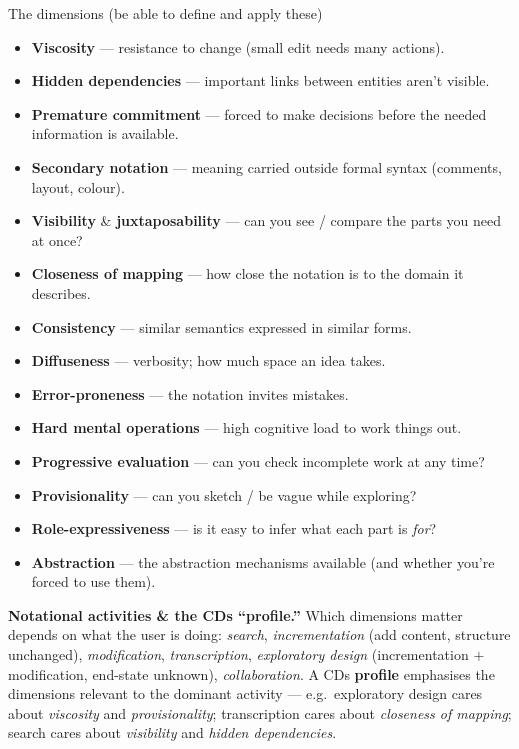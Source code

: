 \documentclass[11pt,a4paper]{article}
\begin{document}
\begin{plain}{The dimensions (be able to define and apply these)}
\begin{itemize}[leftmargin=*,itemsep=0.5pt]
  \item \textbf{Viscosity} --- resistance to change (small edit needs many actions).
  \item \textbf{Hidden dependencies} --- important links between entities aren't visible.
  \item \textbf{Premature commitment} --- forced to make decisions before the needed information is available.
  \item \textbf{Secondary notation} --- meaning carried outside formal syntax (comments, layout, colour).
  \item \textbf{Visibility} \& \textbf{juxtaposability} --- can you see / compare the parts you need at once?
  \item \textbf{Closeness of mapping} --- how close the notation is to the domain it describes.
  \item \textbf{Consistency} --- similar semantics expressed in similar forms.
  \item \textbf{Diffuseness} --- verbosity; how much space an idea takes.
  \item \textbf{Error-proneness} --- the notation invites mistakes.
  \item \textbf{Hard mental operations} --- high cognitive load to work things out.
  \item \textbf{Progressive evaluation} --- can you check incomplete work at any time?
  \item \textbf{Provisionality} --- can you sketch / be vague while exploring?
  \item \textbf{Role-expressiveness} --- is it easy to infer what each part is \emph{for}?
  \item \textbf{Abstraction} --- the abstraction mechanisms available (and whether you're forced to use them).
\end{itemize}
\end{plain}

\textbf{Notational activities \& the CDs ``profile.''} Which dimensions matter depends on what the user is doing: \emph{search}, \emph{incrementation} (add content, structure unchanged), \emph{modification}, \emph{transcription}, \emph{exploratory design} (incrementation $+$ modification, end-state unknown), \emph{collaboration}. A CDs \textbf{profile} emphasises the dimensions relevant to the dominant activity --- e.g.\ exploratory design cares about \emph{viscosity} and \emph{provisionality}; transcription cares about \emph{closeness of mapping}; search cares about \emph{visibility} and \emph{hidden dependencies}.
\end{document}
